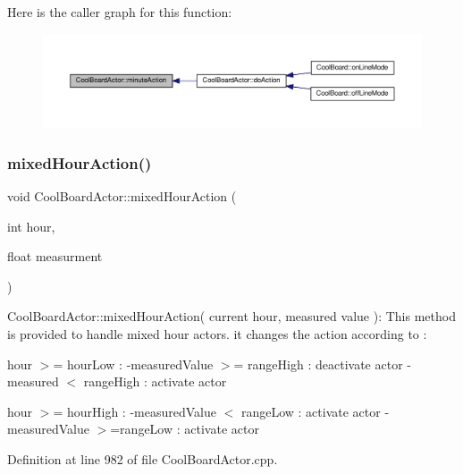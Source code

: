 Here is the caller graph for this function\+:\nopagebreak
\begin{figure}[H]
\begin{center}
\leavevmode
\includegraphics[width=350pt]{dc/d69/class_cool_board_actor_af000944ce0b9abb9c6ee4b8fe839fb36_icgraph}
\end{center}
\end{figure}
\mbox{\label{class_cool_board_actor_a6d93a24502c56ced2ef7675c913a276b}} 
\subsubsection{\texorpdfstring{mixed\+Hour\+Action()}{mixedHourAction()}}
{\footnotesize\ttfamily void Cool\+Board\+Actor\+::mixed\+Hour\+Action (\begin{DoxyParamCaption}\item[{int}]{hour,  }\item[{float}]{measurment }\end{DoxyParamCaption})}

Cool\+Board\+Actor\+::mixed\+Hour\+Action( current hour, measured value )\+: This method is provided to handle mixed hour actors. it changes the action according to \+:

hour $>$= hour\+Low \+: -\/measured\+Value $>$= range\+High \+: deactivate actor -\/measured $<$ range\+High \+: activate actor

hour $>$= hour\+High \+: -\/measured\+Value $<$ range\+Low \+: activate actor -\/measured\+Value $>$=range\+Low \+: activate actor 

Definition at line 982 of file Cool\+Board\+Actor.\+cpp.


